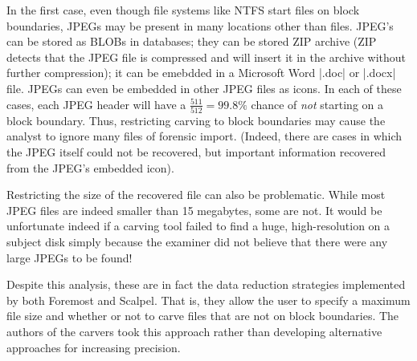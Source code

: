 \documentclass[11pt,letter]{article}
\begin{document}
In the first case, even though file systems like NTFS start
files on block boundaries, JPEGs may be present in many locations
other than files. JPEG's can be stored as BLOBs in databases; they can
be stored ZIP archive (ZIP detects that the JPEG file is compressed
and will insert it in the archive without further compression); it can
be emebdded in a Microsoft Word |.doc| or |.docx| file. JPEGs can even
be embedded in other JPEG files as icons. In each of these cases, each
JPEG header will have a $\frac{511}{512}=99.8\%$ chance of \emph{not}
starting on a block boundary. Thus, restricting carving to block
boundaries may cause the analyst to ignore many files of forensic
import. (Indeed, there are cases in which the JPEG itself could not be
recovered, but important information recovered from the JPEG's 
embedded icon).

Restricting the size of the recovered file can also be
problematic. While most JPEG files are indeed smaller than 15
megabytes, some are not. It would be unfortunate indeed if a carving
tool failed to find a huge, high-resolution on a subject disk simply
because the examiner did not believe that there were any large JPEGs
to be found!


Despite this analysis, these are in fact the data reduction strategies
implemented by both Foremost and Scalpel. That is, they allow the user
to specify a maximum file size and whether or not to carve files that
are not on block boundaries. The authors of the carvers took this
approach rather than developing alternative approaches for increasing
precision. 
\end{document}
